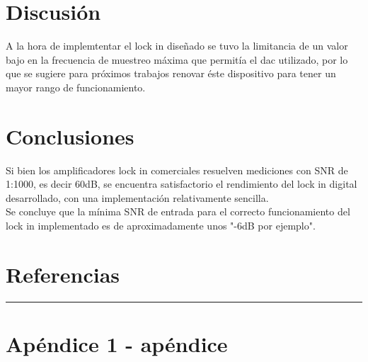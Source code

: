 \documentclass[11pt,a4paper]{extarticle}
\begin{document}
\begin{multicols}{2}
\section{Discusión}
A la hora de implemtentar el lock in diseñado se tuvo 
la limitancia de un valor bajo en la frecuencia de 
muestreo máxima que permitía el dac utilizado, por lo 
que se sugiere para próximos trabajos renovar éste 
dispositivo para tener un mayor rango de funcionamiento.\\


\section{Conclusiones}

Si bien los amplificadores lock in comerciales resuelven 
mediciones con SNR de 1:1000, es decir 60dB,
 se encuentra satisfactorio 
el rendimiento del lock in digital desarrollado, con 
una implementación relativamente sencilla.\\

Se concluye que la mínima SNR de entrada para el 
correcto funcionamiento del lock in implementado es de 
aproximadamente unos "-6dB por ejemplo".

\section{Referencias}




\end{multicols}
\newpage
\begin{appendices}
\vspace{-1em}
\hrule
\vspace{1em}
\normalsize
\section{Apéndice 1 - apéndice}
\end{appendices}
\end{document}
